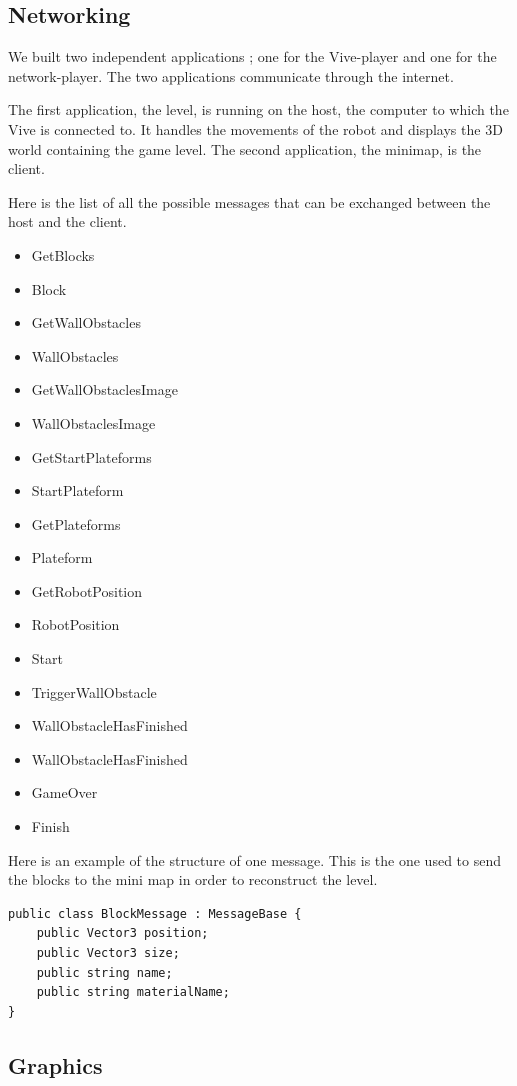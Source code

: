 \documentclass[12pt]{article}
\begin{document}
\subsection{Networking}

We built two independent applications ; one for the Vive-player and one for the network-player. The two applications communicate through the internet.

The first application, the level, is running on the host, the computer to which the Vive is connected to. It handles the movements of the robot and displays the 3D world containing the game level. The second application, the minimap, is the client.

Here is the list of all the possible messages that can be exchanged between the host and the client.

\begin{itemize}  
\item GetBlocks 
\item Block
\item GetWallObstacles 
\item WallObstacles
\item GetWallObstaclesImage 
\item WallObstaclesImage
\item GetStartPlateforms 
\item StartPlateform
\item GetPlateforms 
\item Plateform
\item GetRobotPosition
\item RobotPosition
\item Start
\item TriggerWallObstacle
\item WallObstacleHasFinished
\item WallObstacleHasFinished
\item GameOver
\item Finish
\end{itemize}

Here is an example of the structure of one message. This is the one used to send the blocks to the mini map in order to reconstruct the level.

\begin{lstlisting}
public class BlockMessage : MessageBase {
	public Vector3 position;
	public Vector3 size;
	public string name;
	public string materialName;
}
\end{lstlisting}

\subsection{Graphics}
\end{document}

